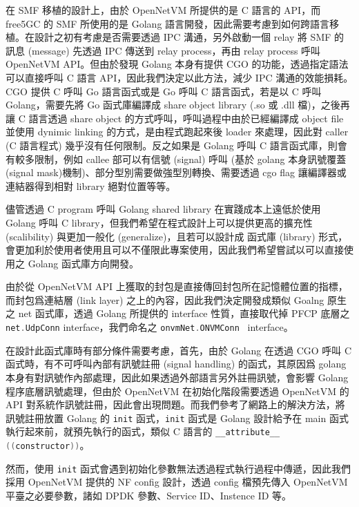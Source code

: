 在 SMF 移植的設計上，由於 OpenNetVM 所提供的是 C 語言的 API，而 free5GC 的 SMF 所使用的是 Golang 語言開發，因此需要考慮到如何跨語言移植。在設計之初有考慮是否需要透過 IPC 溝通，另外啟動一個 relay 將 SMF 的訊息 (message) 先透過 IPC 傳送到 relay process，再由 relay process 呼叫 OpenNetVM API。但由於發現 Golang 本身有提供 CGO 的功能，透過指定語法可以直接呼叫 C 語言 API，因此我們決定以此方法，減少 IPC 溝通的效能損耗。CGO 提供 C 呼叫 Go 語言函式或是 Go 呼叫 C 語言函式，若是以 C 呼叫 Golang，需要先將 Go 函式庫編譯成 share object library (.so 或 .dll 檔)，之後再讓 C 語言透過 share object 的方式呼叫，呼叫過程中由於已經編譯成 object file 並使用 dynimic linking 的方式，是由程式跑起來後 loader 來處理，因此對 caller (C 語言程式) 幾乎沒有任何限制。反之如果是 Golang 呼叫 C 語言函式庫，則會有較多限制，例如 callee 部可以有信號 (signal) 呼叫 (基於 golang 本身訊號覆蓋(signal mask)機制)、部分型別需要做強型別轉換、需要透過 cgo flag 讓編譯器或連結器得到相對 library 絕對位置等等。

儘管透過 C program 呼叫 Golang shared library 在實踐成本上遠低於使用 Golang 呼叫 C library，但我們希望在程式設計上可以提供更高的擴充性 (scalibility) 與更加一般化 (generalize)，且若可以設計成 函式庫 (library) 形式，會更加利於使用者使用且可以不僅限此專案使用，因此我們希望嘗試以可以直接使用之 Golang 函式庫方向開發。

由於從 OpenNetVM API 上獲取的封包是直接傳回封包所在記憶體位置的指標，而封包爲連結層 (link layer) 之上的內容，因此我們決定開發成類似 Goalng 原生之 net 函式庫，透過 Golang 所提供的 interface 性質，直接取代掉 PFCP 底層之 \lstinline[language=Go]{net.UdpConn} interface，我們命名之 \lstinline[language=Go]{onvmNet.ONVMConn}~\cite{github.onvmNet} interface。

在設計此函式庫時有部分條件需要考慮，首先，由於 Golang 在透過 CGO 呼叫 C 函式時，有不可呼叫內部有訊號註冊 (signal handling) 的函式，其原因爲 golang 本身有對訊號作內部處理，因此如果透過外部語言另外註冊訊號，會影響 Golang 程序底層訊號處理，但由於 OpenNetVM 在初始化階段需要透過 OpenNetVM 的 API 對系統作訊號註冊，因此會出現問題。而我們參考了網路上的解決方法，將訊號註冊放置 Golang 的 \lstinline[language=Go]{init} 函式，\lstinline[language=Go]{init} 函式是 Golang 設計給予在 main 函式執行起來前，就預先執行的函式，類似 C 語言的 \lstinline[language=C]{__attribute__ ((constructor))}。

然而，使用 \lstinline[language=Go]{init} 函式會遇到初始化參數無法透過程式執行過程中傳遞，因此我們採用 OpenNetVM 提供的 NF config 設計，透過 config 檔預先傳入 OpenNetVM 平臺之必要參數，諸如 DPDK 參數、Service ID、Instence ID 等。

